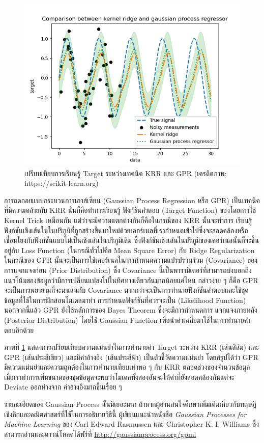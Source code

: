 \begin{figure}[H]
    \centering
    \includegraphics[width=0.9\linewidth]{fig/plot_gpr_kernel.png}
    \caption{เปรียบเทียบการเรียนรู้ Target ระหว่างเทคนิค KRR และ GPR (เครดิตภาพ: https://scikit-learn.org)}
    \label{fig:krr_gpr}
\end{figure}

การถดถอยแบบกระบวนการเกาส์เซียน (Gaussian Process Regression หรือ GPR) เป็นเทคนิคที่มีความคล้ายกับ KRR นั่นก็คือทำการเรียนรู้
ฟังก์ชันคำตอบ (Target Function) ของโดยการใช้ Kernel Trick เหมือนกัน แต่ว่าจะมีความแตกต่างกันก็คือในกรณีของ KRR นั้นจะทำการ%
เรียนรู้ฟังก์ชันเชิงเส้นในในปริภูมิที่ถูกสร้างขึ้นมาใหม่ด้วยเคอร์เนลที่เรากำหนดเข้าไปซึ่งจะสอดคล้องหรือเชื่อมโยงกับฟังก์ชันแบบไม่เป็นเชิงเส้นในปริภูมิเดิม
ซึ่งฟังก์ชันเชิงเส้นในปริภูมิของเคอร์เนลนั้นก็จะขึ้นอยู่กับ Loss Function (ในกรณีทั่วไปคือ Mean Square Error) กับ Ridge Regularization
ในกรณีของ GPR นั้นจะเป็นการใช้เคอร์เนลในการกำหนดความแปรปรวนร่วม (Covariance) ของการแจกแจงก่อน (Prior Distribution)
ซึ่ง Covariance นี้เป็นพารามิเตอร์ที่สามารถบ่งบอกถึงแนวโน้มของข้อมูลว่ามีการเปลี่ยนแปลงไปในทิศทางเดียวกันมากน้อยแค่ไหน กล่าวง่าย ๆ
ก็คือ GPR จะเป็นการพยายามที่จะมาเล่นกับ Covariance มากกว่าจะเป็นการทำนายฟังก์ชันคำตอบและใช้ชุดข้อมูลที่ใช้ในการฝึกสอนโมเดลมาทำ%
การกำหนดฟังก์ชันที่ควรจะเป็น (Likelihood Function) นอกจากนี้แล้ว GPR ยังใช้หลักการของ Bayes Theorem ซึ่งจะมีการกำหนดการ%
แจกแจงภายหลัง (Posterior Distribution) โดยใช้ Gaussian Function เพื่อนำค่าเฉลี่ยมาใช้ในการทำนายคำตอบอีกด้วย

ภาพที่ \ref{fig:krr_gpr} แสดงการเปรียบเทียบความแม่นยำในการทำนายค่า Target ระหว่าง KRR (เส้นสีส้ม) และ GPR (เส้นประสีเขียว)
และมีค่าอ้างอิง (เส้นประสีฟ้า) เป็นตัวชี้วัดความแม่นยำ โดยสรุปได้ว่า GPR มีความแม่นยำและความถูกต้องในการทำนายเทียบเท่าพอ ๆ กับ KRR
ตลอดช่วงของจำนวนข้อมูล เมื่อเราทำการเพิ่มขนาดของชุดข้อมูลจะพบว่าโมเดลทั้งสองอันจะให้ค่าที่ยังสอดคล้องกันแต่จะ Deviate ออกห่างจาก%
ค่าอ้างอิงมากขึ้นเรื่อย ๆ

รายละเอียดของ Gaussian Process นั้นมีเยอะมาก ถ้าหากผู้อ่านสนใจศึกษาเพิ่มเติมเกี่ยวกับทฤษฎีเชิงลึกและคณิตศาสตร์ที่ใช้ในการอธิบายวิธีนี้%
ผู้เขียนแนะนำหนังสือ \textit{Gaussian Processes for Machine Learning} ของ Carl Edward Rasmussen และ
Christopher K. I. Williams ซึ่งสามารถอ่านและดาวน์โหลดได้ฟรีที่ \url{http://gaussianprocess.org/gpml}
